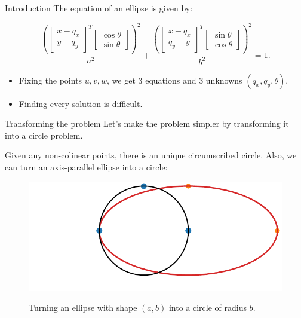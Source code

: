 \documentclass{beamer}
\begin{document}
\begin{frame}{Introduction}
	The equation of an ellipse is given by:
	
	\begin{equation*}
	\frac{\left(\left[\begin{array}{c}
	x-q_x\\
	y-q_y
		\end{array}\right]^T
		\left[\begin{array}{c}
		\cos\theta\\
		\sin\theta
		\end{array}\right]
		\right)^2}{a^2}+\frac{\left(\left[\begin{array}{c}
		x-q_x\\
		q_y-y
		\end{array}\right]^T
		\left[\begin{array}{c}
		\sin\theta\\
		\cos\theta
		\end{array}\right]
		\right)^2}{b^2} = 1.
	\end{equation*}
	
	\begin{itemize}
		\item Fixing the points $u, v, w$, we get $3$ equations and $3$ unknowns $(q_x, q_y, \theta)$.
		\item Finding every solution is difficult.
	\end{itemize}
\end{frame}

\begin{frame}{Transforming the problem}
	Let's make the problem simpler by transforming it into a circle problem.
	
	Given any non-colinear points, there is an unique circumscribed circle. Also, we can turn an axis-parallel ellipse into a circle:
	\begin{figure}
		\centering
		
		\includegraphics[scale=.5]{el1.pdf}
		\label{fig:el1}
		\caption{Turning an ellipse with shape $(a, b)$ into a circle of radius $b$.}
	\end{figure}
	
\end{frame}
\end{document}
